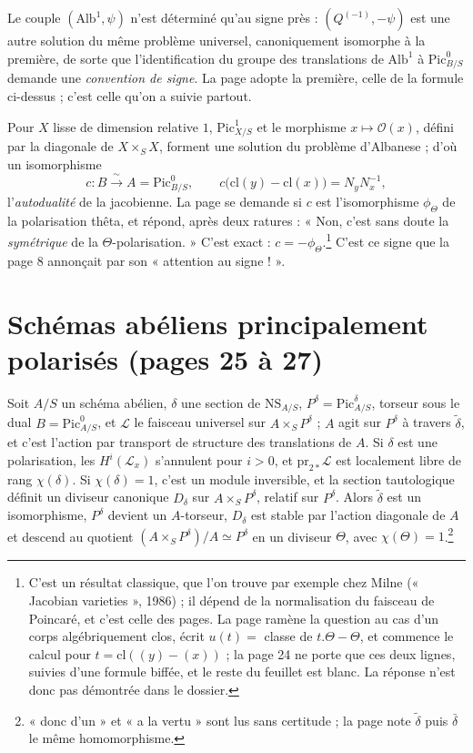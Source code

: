 \documentclass[11pt,a4paper]{article}
\begin{document}
Le couple $(\mathrm{Alb}^{1}, \psi)$ n'est déterminé qu'au signe près :
$(Q^{(-1)}, -\psi)$ est une autre solution du même problème universel,
canoniquement isomorphe à la première, de sorte que l'identification du groupe
des translations de $\mathrm{Alb}^{1}$ à $\mathrm{Pic}^{0}_{B/S}$ demande une
\emph{convention de signe}. La page adopte la première, celle de la formule
ci-dessus ; c'est celle qu'on a suivie partout.

Pour $X$ lisse de dimension relative $1$, $\mathrm{Pic}^{1}_{X/S}$ et le
morphisme $x \mapsto \mathcal{O}(x)$, défini par la diagonale de
$X \times_S X$, forment une solution du problème d'Albanese ; d'où un
isomorphisme
\[
c : B \xrightarrow{\ \sim\ } A = \mathrm{Pic}^{0}_{B/S},
\qquad c\bigl(\mathrm{cl}(y) - \mathrm{cl}(x)\bigr) = N_y N_x^{-1},
\]
l'\emph{autodualité} de la jacobienne. La page se demande si $c$ est
l'isomorphisme $\phi_{\Theta}$ de la polarisation thêta, et répond, après deux
ratures : « Non, c'est sans doute la \emph{symétrique} de la
$\Theta$-polarisation. » C'est exact : $c = -\phi_{\Theta}$.\footnote{C'est
un résultat classique, que l'on trouve par exemple chez Milne (« Jacobian
varieties », 1986) ; il dépend de la normalisation du faisceau de Poincaré, et
c'est celle des pages. La page ramène la question au cas d'un corps
algébriquement clos, écrit $u(t) = $ classe de $t.\Theta - \Theta$, et
commence le calcul pour $t = \mathrm{cl}((y) - (x))$ ; la page 24 ne porte que
ces deux lignes, suivies d'une formule biffée, et le reste du feuillet est
blanc. La réponse n'est donc pas démontrée dans le dossier.} C'est ce signe que
la page 8 annonçait par son « attention au signe ! ».

\section*{Schémas abéliens principalement polarisés (pages 25 à 27)}

Soit $A/S$ un schéma abélien, $\delta$ une section de $\mathrm{NS}_{A/S}$,
$P^{\delta} = \mathrm{Pic}^{\delta}_{A/S}$, torseur sous le dual
$B = \mathrm{Pic}^{0}_{A/S}$, et $\mathcal{L}$ le faisceau universel sur
$A \times_S P^{\delta}$ ; $A$ agit sur $P^{\delta}$ à travers $\tilde{\delta}$,
et c'est l'action par transport de structure des translations de $A$. Si
$\delta$ est une polarisation, les $H^{i}(\mathcal{L}_x)$ s'annulent pour
$i > 0$, et $\mathrm{pr}_{2*}\mathcal{L}$ est localement libre de rang
$\chi(\delta)$. Si $\chi(\delta) = 1$, c'est un module inversible, et la
section tautologique définit un diviseur canonique $D_{\delta}$ sur
$A \times_S P^{\delta}$, relatif sur $P^{\delta}$. Alors $\tilde{\delta}$ est
un isomorphisme, $P^{\delta}$ devient un $A$-torseur, $D_{\delta}$ est stable
par l'action diagonale de $A$ et descend au quotient
$(A \times_S P^{\delta})/A \simeq P^{\delta}$ en un diviseur $\Theta$, avec
$\chi(\Theta) = 1$.\footnote{« donc d'un » et « a la vertu » sont lus sans
certitude ; la page note $\tilde{\delta}$ puis $\bar{\delta}$ le même
homomorphisme.}
\end{document}
